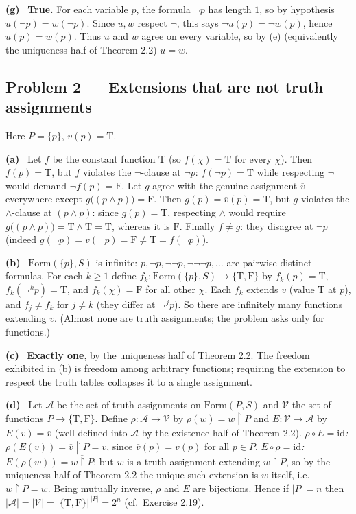 \documentclass[11pt]{article}
\newcommand{\Form}{\mathrm{Form}}
\newcommand{\T}{\mathrm{T}}
\newcommand{\F}{\mathrm{F}}
\newcommand{\TF}{\{\T,\F\}}
\newcommand{\ext}[1]{\overline{#1}}
\newcommand{\solpart}[1]{\smallskip\noindent\textbf{(#1)}\ }
\newcommand{\prob}[2]{\subsection*{Problem #1 --- #2}}
\begin{document}
\solpart{g} \textbf{True.} For each variable $p$, the formula $\lnot p$ has length
$1$, so by hypothesis $u(\lnot p)=w(\lnot p)$. Since $u,w$ respect $\lnot$, this
says $\lnot u(p)=\lnot w(p)$, hence $u(p)=w(p)$. Thus $u$ and $w$ agree on every
variable, so by (e) (equivalently the uniqueness half of Theorem 2.2) $u=w$.

\prob{2}{Extensions that are not truth assignments}

Here $P=\{p\}$, $v(p)=\T$.

\solpart{a} Let $f$ be the constant function $\T$ (so $f(\chi)=\T$ for every
$\chi$). Then $f(p)=\T$, but $f$ violates the $\lnot$-clause at $\lnot p$:
$f(\lnot p)=\T$ while respecting $\lnot$ would demand $\lnot f(p)=\F$.
Let $g$ agree with the genuine assignment $\ext{v}$ everywhere except
$g\big((p\land p)\big)=\F$. Then $g(p)=\ext{v}(p)=\T$, but $g$ violates the
$\land$-clause at $(p\land p)$: since $g(p)=\T$, respecting $\land$ would require
$g\big((p\land p)\big)=\T\land\T=\T$, whereas it is $\F$. Finally $f\neq g$: they
disagree at $\lnot p$ (indeed $g(\lnot p)=\ext{v}(\lnot p)=\F\neq\T=f(\lnot p)$).

\solpart{b} $\Form(\{p\},S)$ is infinite: $p,\lnot p,\lnot\lnot p,\lnot\lnot\lnot
p,\dots$ are pairwise distinct formulas. For each $k\ge 1$ define
$f_k\colon\Form(\{p\},S)\to\TF$ by $f_k(p)=\T$, $f_k(\lnot^{\,k}p)=\T$, and
$f_k(\chi)=\F$ for all other $\chi$. Each $f_k$ extends $v$ (value $\T$ at $p$),
and $f_j\ne f_k$ for $j\ne k$ (they differ at $\lnot^{\,j}p$). So there are
infinitely many functions extending $v$. (Almost none are truth assignments; the
problem asks only for functions.)

\solpart{c} \textbf{Exactly one}, by the uniqueness half of Theorem 2.2. The
freedom exhibited in (b) is freedom among arbitrary functions; requiring the
extension to respect the truth tables collapses it to a single assignment.

\solpart{d} Let $\mathcal{A}$ be the set of truth assignments on $\Form(P,S)$ and
$\mathcal{V}$ the set of functions $P\to\TF$. Define
$\rho\colon\mathcal{A}\to\mathcal{V}$ by $\rho(w)=w{\restriction}P$ and
$E\colon\mathcal{V}\to\mathcal{A}$ by $E(v)=\ext{v}$ (well-defined into
$\mathcal{A}$ by the existence half of Theorem 2.2).
\emph{$\rho\circ E=\mathrm{id}$:} $\rho(E(v))=\ext{v}{\restriction}P=v$, since
$\ext{v}(p)=v(p)$ for all $p\in P$.
\emph{$E\circ\rho=\mathrm{id}$:} $E(\rho(w))=\overline{w{\restriction}P}$; but $w$
is a truth assignment extending $w{\restriction}P$, so by the uniqueness half of
Theorem 2.2 the unique such extension is $w$ itself, i.e.\
$\overline{w{\restriction}P}=w$.
Being mutually inverse, $\rho$ and $E$ are bijections. Hence if $|P|=n$ then
$|\mathcal{A}|=|\mathcal{V}|=|\TF|^{\,|P|}=2^n$ (cf.\ Exercise 2.19).
\end{document}
